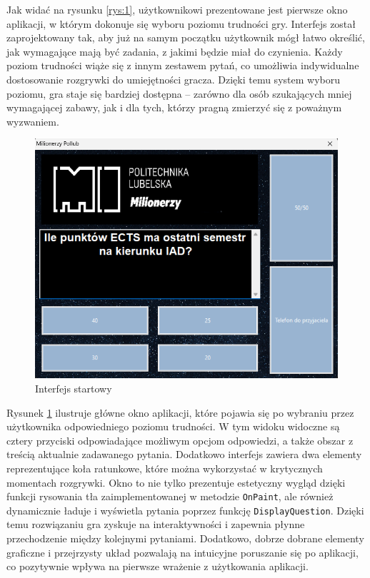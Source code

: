\documentclass[]{article}
\begin{document}
Jak widać na rysunku \ref{rys:1}, użytkownikowi prezentowane jest pierwsze okno aplikacji, w którym dokonuje się wyboru poziomu trudności gry. Interfejs został zaprojektowany tak, aby już na samym początku użytkownik mógł łatwo określić, jak wymagające mają być zadania, z jakimi będzie miał do czynienia. Każdy poziom trudności wiąże się z innym zestawem pytań, co umożliwia indywidualne dostosowanie rozgrywki do umiejętności gracza. Dzięki temu system wyboru poziomu, gra staje się bardziej dostępna – zarówno dla osób szukających mniej wymagającej zabawy, jak i dla tych, którzy pragną zmierzyć się z poważnym wyzwaniem.
	
	\begin{figure}[H]
		\centering
		\includegraphics[scale=0.3]{2.png}
		\caption{Interfejs startowy}
		\label{rys:2}
	\end{figure}
Rysunek \ref{rys:2} ilustruje główne okno aplikacji, które pojawia się po wybraniu przez użytkownika odpowiedniego poziomu trudności. W tym widoku widoczne są cztery przyciski odpowiadające możliwym opcjom odpowiedzi, a także obszar z treścią aktualnie zadawanego pytania. Dodatkowo interfejs zawiera dwa elementy reprezentujące koła ratunkowe, które można wykorzystać w krytycznych momentach rozgrywki. Okno to nie tylko prezentuje estetyczny wygląd dzięki funkcji rysowania tła zaimplementowanej w metodzie \texttt{OnPaint}, ale również dynamicznie ładuje i wyświetla pytania poprzez funkcję \texttt{DisplayQuestion}. Dzięki temu rozwiązaniu gra zyskuje na interaktywności i zapewnia płynne przechodzenie między kolejnymi pytaniami. Dodatkowo, dobrze dobrane elementy graficzne i przejrzysty układ pozwalają na intuicyjne poruszanie się po aplikacji, co pozytywnie wpływa na pierwsze wrażenie z użytkowania aplikacji.
	
\end{document}
